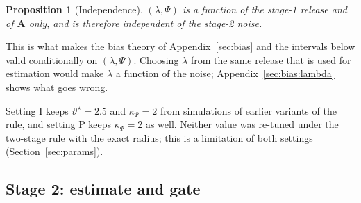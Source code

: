 \documentclass[11pt]{article}
\theoremstyle{definition}
\theoremstyle{plain}
\newtheorem{proposition}{Proposition}[section]
\newcommand{\bA}{\mathbf{A}}
\begin{document}
\begin{proposition}[Independence]
\label{prop:indep}
$(\lambda, \Psi)$ is a function of the stage-1 release and of $\bA$ only, and is therefore independent of the stage-2 noise.
\end{proposition}

This is what makes the bias theory of Appendix~\ref{sec:bias} and the intervals below valid conditionally on $(\lambda, \Psi)$. Choosing $\lambda$ from the same release that is used for estimation would make $\lambda$ a function of the noise; Appendix~\ref{sec:bias:lambda} shows what goes wrong.

Setting I keeps $\vartheta^\star = 2.5$ and $\kappa_\Psi = 2$ from simulations of earlier variants of the rule, and setting P keeps $\kappa_\Psi = 2$ as well. Neither value was re-tuned under the two-stage rule with the exact radius; this is a limitation of both settings (Section~\ref{sec:params}).

\subsection{Stage 2: estimate and gate}
\label{sec:stats:stage2}
\end{document}

